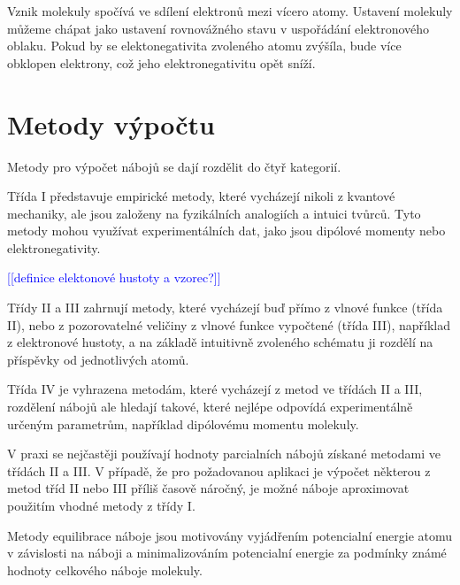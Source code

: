 \documentclass[10pt,draft,oneside]{fithesis2}
\newcommand\todo[1]{\textcolor{blue}{[[#1]]}}
\begin{document}
Vznik molekuly spočívá ve sdílení elektronů mezi vícero atomy. Ustavení molekuly můžeme chápat jako ustavení rovnovážného stavu v uspořádání elektronového oblaku. Pokud by se elektonegativita zvoleného atomu zvýšíla, bude více obklopen elektrony, což jeho elektronegativitu opět sníží.

\section{Metody výpočtu}

Metody pro výpočet nábojů se dají rozdělit do čtyř kategorií. \citep[s.~50]{cramer2004essentials}

Třída I představuje empirické metody, které vycházejí nikoli z kvantové mechaniky, ale jsou založeny na fyzikálních analogiích a intuici tvůrců. Tyto metody mohou využívat experimentálních dat, jako jsou dipólové momenty nebo elektronegativity.

\todo{definice elektonové hustoty a vzorec?}

Třídy II a III zahrnují metody, které vycházejí buď přímo z vlnové funkce (třída II), nebo z pozorovatelné veličiny z vlnové funkce vypočtené (třída III), například z elektronové hustoty, a na základě intuitivně zvoleného schématu ji rozdělí na příspěvky od jednotlivých atomů.

Třída IV je vyhrazena metodám, které vycházejí z metod ve třídách II a III, rozdělení nábojů ale hledají takové, které nejlépe odpovídá experimentálně určeným parametrům, například dipólovému momentu molekuly.

V praxi se nejčastěji používají hodnoty parcialních nábojů získané metodami ve třídách II a III. V případě, že pro požadovanou aplikaci je výpočet některou z metod tříd II nebo III příliš časově náročný, je možné náboje aproximovat použitím vhodné metody z třídy I.






Metody equilibrace náboje jsou motivovány vyjádřením potencialní energie atomu v závislosti na náboji a minimalizováním potencialní energie za podmínky známé hodnoty celkového náboje molekuly.
\end{document}
